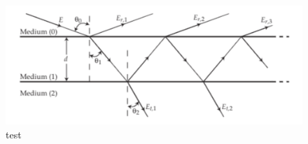 \documentclass{article}
\begin{document}














\begin{figure}[h]
    \centering
   \includegraphics[scale=0.6]{three phase optical system.png} 
   \caption*{test}
\end{figure}
\end{document}
